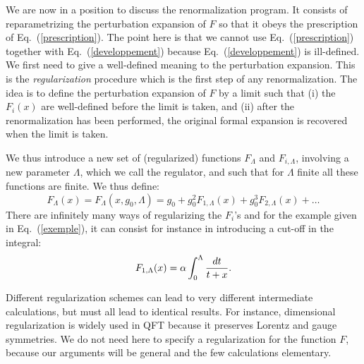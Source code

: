 \documentclass[floatfix,twocolumn,preprintnumbers,amsmath,amssymb,prb]{revtex4}
\begin{document}
We are now in a position to discuss the renormalization program. It
consists of reparametrizing the perturbation expansion of
$F$ so that it obeys the prescription of
Eq.~(\ref{prescription}). The point here is that we cannot use
Eq.~(\ref{prescription}) together with Eq.~(\ref{developpement})
because Eq.~(\ref{developpement}) is ill-defined. We first need to
give a well-defined meaning to the perturbation expansion. This is
the {\em regularization} procedure which is the first step of any
renormalization.\cite{delbourgo76,nyeo00} The idea is to define the
perturbation expansion of $F$ by a limit such that (i) the
$F_i(x)$ are well-defined before the limit is taken, and (ii)
after the renormalization has been performed, the original formal
expansion is recovered when the limit is taken. 

We thus introduce a new set of (regularized) functions $F_\Lambda$
and 
$F_{i,\Lambda}$, involving a new parameter
$\Lambda$, which we call the regulator, and such that for $\Lambda$
finite all these functions are finite. We thus define:
\begin{equation}
F_\Lambda(x)=F_\Lambda(x,g_0,\Lambda)= g_0 +g_0^2 
F_{1,\Lambda}(x) + g_0^3 F_{2,\Lambda}(x) + \dots
\label{perturbationreg}
\end{equation}
There are infinitely many ways of regularizing the $F_i$'s and for
the example given in Eq.~(\ref{exemple}), it can consist for
instance in introducing a cut-off in the integral:
\begin{equation}
F_{1,\Lambda}(x)= \alpha \int_0^\Lambda {dt\over t+x}.
\label{exempleregularise}
\end{equation}

Different regularization schemes can lead to very different
intermediate calculations, but must all lead to identical
results.\cite{foot5} For instance, dimensional regularization is
widely used in QFT because it preserves Lorentz and gauge
symmetries.\cite{hans83,gosdzinsky91,mitra98,kraus92} We do not
need here to specify a regularization for the function $F$, because
our arguments will be general and the few calculations elementary.
\end{document}
